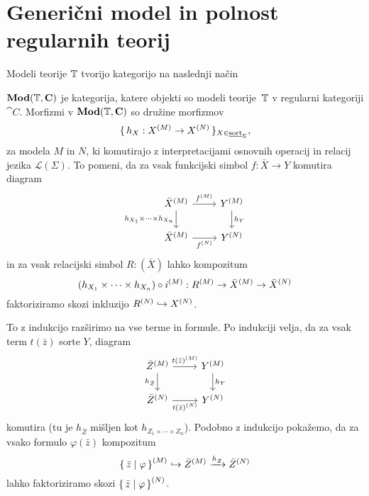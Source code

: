 \documentclass[../kategoricna_logika.tex]{subfiles}
\begin{document}
  \section{Generični model in polnost regularnih teorij}
  Modeli teorije $\T$ tvorijo kategorijo na naslednji način
  \begin{definicija}
    $\Mod(\T, \cat{C})$ je kategorija, katere objekti so modeli
    teorije~$\T$ v regularni kategoriji $\cat{C}$. Morfizmi v
    $\Mod(\T, \cat{C})$ so družine morfizmov
    $$\set{h_X : \interp{X} \to \interp[N]{X}}_{X \in \underline{\mathrm{sort}}_\Sigma},$$
    za modela $M$ in $N$, ki komutirajo z interpretacijami osnovnih operacij in relacij jezika
    $\mathcal{L}(\Sigma)$.
    To pomeni, da za vsak funkcijski simbol $f : \bar{X} \to Y$ komutira diagram
    \begin{equation*}
  \begin{tikzcd}
    \interp{\bar{X}} \ar[d, "h_{X_1} \times \cdots \times h_{X_n}"'] \ar[r, "\interp{f}"] & \interp{Y} \ar[d, "h_Y"]\\
    \interp{\bar{X}} \ar[r, "{\interp[N]{f}}"'] & \interp[N]{Y}
  \end{tikzcd}
\end{equation*}
in za vsak relacijski simbol $R : (\bar{X})$ lahko kompozitum
$$(h_{X_1} \times \cdots \times h_{X_n}) \circ \interp{i} : \interp{R} \to \interp{\bar{X}} \to \interp[N]{\bar{X}}$$
faktoriziramo skozi inkluzijo $\interp[N]{R} \hookrightarrow \interp[N]{X}$.
\end{definicija}
To z indukcijo razširimo na vse terme in formule. Po indukciji
velja, da za vsak term $t(\bar{z})$ sorte $Y$, diagram
\begin{equation*}
  \begin{tikzcd}
    \interp{\bar{Z}} \ar[d, "h_{\bar{Z}}"'] \ar[r, "{t(\bar{z})^{(M)}}"] & \interp{Y} \ar[d, "h_Y"] \\
    \interp[N]{\bar{Z}} \ar[r, "{\interp[N]{t(\bar{z})}}"'] &
    \interp[N]{Y}
  \end{tikzcd}
\end{equation*}
komutira (tu je $h_{\bar{Z}}$ mišljen kot
$h_{Z_1 \times \cdots \times Z_n}$).  Podobno z indukcijo pokažemo, da
za vsako formulo $\varphi(\bar{z})$ kompozitum
$$\interp{\set{\bar{z}  \mid  \varphi}} \hookrightarrow \interp{\bar{Z}} \xrightarrow{h_{\bar{Z}}} \interp[N]{\bar{Z}}$$
lahko faktoriziramo skozi
$\interp[N]{\set{\bar{z}  \mid  \varphi}}$.
\end{document}

